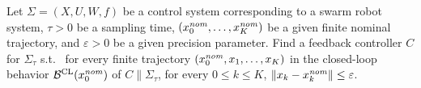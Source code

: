 \begin{problem}\label{prob:tracking_with_time}
	Let $\Sigma=(X,U,W,f)$ be a control system corresponding to a swarm robot system, $\tau>0$ be a sampling time, $(x_0^{\mathit{nom}},\ldots,x_K^{\mathit{nom}})$ be a given finite nominal trajectory, and $\varepsilon>0$ be a given precision parameter.
	Find a feedback controller $C$ for $\Sigma_\tau$ s.t.\ 
	for every finite trajectory $(x_0^{\mathit{nom}},x_1,\ldots,x_K)$ in the closed-loop behavior $\mathcal{B}^{\mathrm{CL}}(x_0^{\mathit{nom}})$ of $C \parallel \Sigma_\tau$, for every $0\leq k \leq K$, $\| x_k-x_k^{\mathit{nom}} \| \leq \varepsilon$.
\end{problem}

